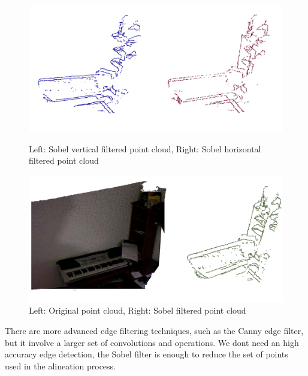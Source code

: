 \begin{figure}[h!]
\begin{center}
\includegraphics[scale=0.35]{images/sobel_v_h.png}
\caption{Left: Sobel vertical filtered point cloud, Right: Sobel horizontal filtered point cloud}
\end{center}

\begin{center}
\includegraphics[scale=0.35]{images/sobel_o_g.png}
\caption{Left: Original point cloud, Right: Sobel filtered point cloud}
\end{center}
\end{figure}

There are more advanced edge filtering techniques, such as the Canny edge filter, but it involve 
a larger set of convolutions and operations. We dont need an high accuracy edge detection, the Sobel 
filter is enough to reduce the set of points used in the alineation process.

